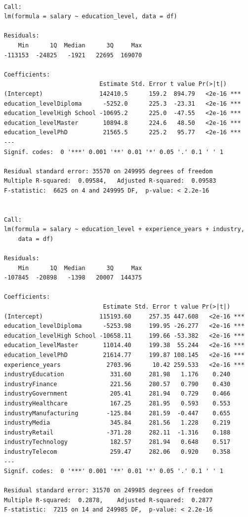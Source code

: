 \documentclass[
  letterpaper,
  DIV=11,
  numbers=noendperiod]{scrartcl}
\begin{document}
\begin{verbatim}

Call:
lm(formula = salary ~ education_level, data = df)

Residuals:
    Min      1Q  Median      3Q     Max 
-113153  -24825   -1921   22695  169070 

Coefficients:
                           Estimate Std. Error t value Pr(>|t|)    
(Intercept)                142410.5      159.2  894.79   <2e-16 ***
education_levelDiploma      -5252.0      225.3  -23.31   <2e-16 ***
education_levelHigh School -10695.2      225.0  -47.55   <2e-16 ***
education_levelMaster       10894.8      224.6   48.50   <2e-16 ***
education_levelPhD          21565.5      225.2   95.77   <2e-16 ***
---
Signif. codes:  0 '***' 0.001 '**' 0.01 '*' 0.05 '.' 0.1 ' ' 1

Residual standard error: 35570 on 249995 degrees of freedom
Multiple R-squared:  0.09584,   Adjusted R-squared:  0.09583 
F-statistic:  6625 on 4 and 249995 DF,  p-value: < 2.2e-16


Call:
lm(formula = salary ~ education_level + experience_years + industry, 
    data = df)

Residuals:
    Min      1Q  Median      3Q     Max 
-107845  -20898   -1398   20007  144375 

Coefficients:
                            Estimate Std. Error t value Pr(>|t|)    
(Intercept)                115193.60     257.35 447.608   <2e-16 ***
education_levelDiploma      -5253.98     199.95 -26.277   <2e-16 ***
education_levelHigh School -10658.11     199.66 -53.382   <2e-16 ***
education_levelMaster       11014.40     199.38  55.244   <2e-16 ***
education_levelPhD          21614.77     199.87 108.145   <2e-16 ***
experience_years             2703.96      10.42 259.533   <2e-16 ***
industryEducation             331.60     281.98   1.176    0.240    
industryFinance               221.56     280.57   0.790    0.430    
industryGovernment            205.41     281.94   0.729    0.466    
industryHealthcare            167.25     281.95   0.593    0.553    
industryManufacturing        -125.84     281.59  -0.447    0.655    
industryMedia                 345.84     281.56   1.228    0.219    
industryRetail               -371.28     282.11  -1.316    0.188    
industryTechnology            182.57     281.94   0.648    0.517    
industryTelecom               259.47     282.06   0.920    0.358    
---
Signif. codes:  0 '***' 0.001 '**' 0.01 '*' 0.05 '.' 0.1 ' ' 1

Residual standard error: 31570 on 249985 degrees of freedom
Multiple R-squared:  0.2878,    Adjusted R-squared:  0.2877 
F-statistic:  7215 on 14 and 249985 DF,  p-value: < 2.2e-16



\end{verbatim}
\end{document}
